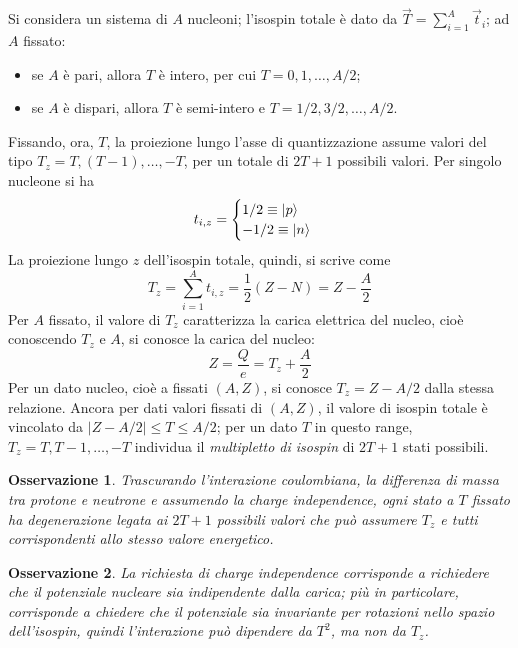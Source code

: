 \documentclass[11pt, a4paper]{scrartcl}
\theoremstyle{style}
\newtheorem{osservazione}{Osservazione}[section]
\numberwithin{equation}{subsection}
\begin{document}
Si considera un sistema di $A$ nucleoni; l'isospin totale \`e dato da $\vec{T} = \sum_{i=1}^{A} \vec{t}_i$; ad $A$ fissato:
\begin{itemize}
	\item se $A$ \`e pari, allora $T$ \`e intero, per cui $T = 0,1,\ldots,A / 2$;
	\item se $A$ \`e dispari, allora $T$ \`e semi-intero e $T = 1 / 2, 3 / 2 ,\ldots, A / 2$.
\end{itemize}
Fissando, ora, $T$, la proiezione lungo l'asse di quantizzazione assume valori del tipo $T_z = T , (T-1) ,\ldots, -T$, per un totale di $2T + 1$ possibili valori.
Per singolo nucleone si ha
\[
t_{i,z} = \begin{cases}
	1 / 2 \equiv \ket{p} \\
	-1  / 2 \equiv \ket{n} 
\end{cases}
\] 
La proiezione lungo $z$ dell'isospin totale, quindi, si scrive come
\[
T_z = \sum_{i=1}^{A} t_{i,z} = \frac{1}{2} \left(Z - N\right) = Z - \frac{A}{2}
\] 
Per $A$ fissato, il valore di $T_z$ caratterizza la carica elettrica del nucleo, cio\`e conoscendo $T_z$ e $A$, si conosce la carica del nucleo:
\[
Z = \frac{Q}{e} = T_z + \frac{A}{2}
\] 
Per un dato nucleo, cio\`e a fissati $(A,Z)$, si conosce $T_z = Z - A / 2$ dalla stessa relazione.
Ancora per dati valori fissati di $(A,Z)$, il valore di isospin totale \`e vincolato da $\left\lvert Z - A / 2 \right\rvert  \le  T \le  A / 2$; per un dato $T$ in questo range, $T_z = T , T-1 ,\ldots,-T$ individua il \textit{multipletto di isospin} di $2T + 1$ stati possibili.
\begin{osservazione}
	Trascurando l'interazione coulombiana, la differenza di massa tra protone e neutrone e assumendo la charge independence, ogni stato a $T$ fissato ha degenerazione legata ai $2T+1$ possibili valori che pu\`o assumere $T_z$ e tutti corrispondenti allo stesso valore energetico. 
\end{osservazione}
\begin{osservazione}
La richiesta di charge independence corrisponde a richiedere che il potenziale nucleare sia indipendente dalla carica; pi\`u in particolare, corrisponde a chiedere che il potenziale sia invariante per rotazioni nello spazio dell'isospin, quindi l'interazione pu\`o dipendere da $T^2$, ma non da $T_z$.
\end{osservazione}
\end{document}

